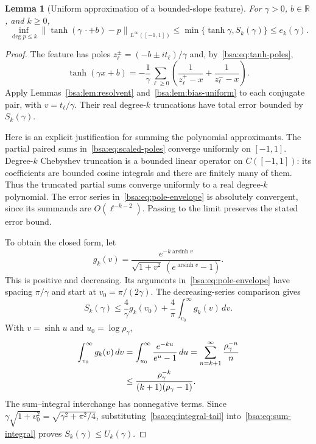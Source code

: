 \documentclass[11pt,letterpaper]{article}
\newcommand{\bsaNorm}[1]{\left\lVert #1\right\rVert}
\newcommand{\bsaRR}{\mathbb R}
\DeclareMathOperator{\bsaArsinh}{arsinh}
\newtheorem{bsaLemma}{Lemma}[section]
\theoremstyle{remark}
\theoremstyle{plain}
\begin{document}
\begin{bsaLemma}[Uniform approximation of a bounded-slope feature]
\label{bsa:lem:tanh-approximation}
For $\gamma>0$, $b\in\bsaRR$, and $k\ge0$,
\begin{equation}
 \inf_{\deg p\le k}\bsaNorm{\tanh(\gamma\,\cdot+b)-p}_{L^\infty([-1,1])}
 \le\min\{\tanh\gamma,S_k(\gamma)\}
 \le e_k(\gamma).
 \label{bsa:eq:feature-approximation}
\end{equation}
\end{bsaLemma}
\begin{proof}
The feature has poles $z_\ell^\pm=(-b\pm it_\ell)/\gamma$ and, by~\eqref{bsa:eq:tanh-poles},
\begin{equation}
 \tanh(\gamma x+b)
 =-\frac1\gamma\sum_{\ell\ge0}
 \left(\frac1{z_\ell^+-x}+\frac1{z_\ell^--x}\right).
 \label{bsa:eq:scaled-poles}
\end{equation}
Apply Lemmas~\ref{bsa:lem:resolvent} and~\ref{bsa:lem:bias-uniform} to each conjugate pair, with $v=t_\ell/\gamma$. Their real degree-$k$ truncations have total error bounded by $S_k(\gamma)$.

Here is an explicit justification for summing the polynomial approximants. The partial paired sums in~\eqref{bsa:eq:scaled-poles} converge uniformly on $[-1,1]$. Degree-$k$ Chebyshev truncation is a bounded linear operator on $C([-1,1])$: its coefficients are bounded cosine integrals and there are finitely many of them. Thus the truncated partial sums converge uniformly to a real degree-$k$ polynomial. The error series in~\eqref{bsa:eq:pole-envelope} is absolutely convergent, since its summands are $O(\ell^{-k-2})$. Passing to the limit preserves the stated error bound.

To obtain the closed form, let
\[
 g_k(v)=\frac{e^{-k\bsaArsinh v}}
 {\sqrt{1+v^2}\,(e^{\bsaArsinh v}-1)}.
\]
This is positive and decreasing. Its arguments in~\eqref{bsa:eq:pole-envelope} have spacing $\pi/\gamma$ and start at $v_0=\pi/(2\gamma)$. The decreasing-series comparison gives
\begin{equation}
 S_k(\gamma)\le\frac4\gamma g_k(v_0)
 +\frac4\pi\int_{v_0}^{\infty}g_k(v)\,dv.
 \label{bsa:eq:sum-integral}
\end{equation}
With $v=\sinh u$ and $u_0=\log\rho_\gamma$,
\begin{align}
 \int_{v_0}^{\infty}g_k(v)\,dv
 &=\int_{u_0}^{\infty}\frac{e^{-ku}}{e^u-1}\,du
 =\sum_{n=k+1}^{\infty}\frac{\rho_\gamma^{-n}}n\notag\\
 &\le\frac{\rho_\gamma^{-k}}{(k+1)(\rho_\gamma-1)}.
 \label{bsa:eq:integral-tail}
\end{align}
The sum--integral interchange has nonnegative terms. Since $\gamma\sqrt{1+v_0^2}=\sqrt{\gamma^2+\pi^2/4}$, substituting~\eqref{bsa:eq:integral-tail} into~\eqref{bsa:eq:sum-integral} proves $S_k(\gamma)\le U_k(\gamma)$.


\end{proof}
\end{document}
